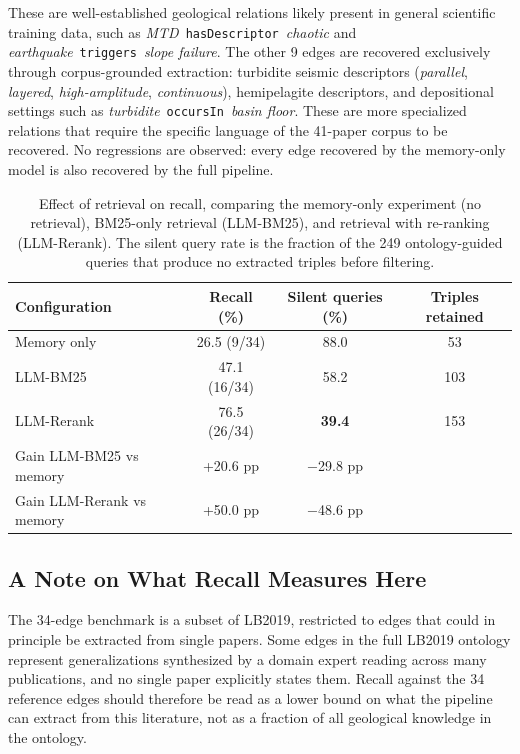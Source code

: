 \documentclass[10pt]{article}
\newcommand{\pred}[1]{\texttt{\small #1}}
\begin{document}
These are well-established geological relations likely present in
general scientific training data, such as
\emph{MTD}~\pred{hasDescriptor}~\emph{chaotic} and
\emph{earthquake}~\pred{triggers}~\emph{slope failure}.
The other 9 edges are recovered exclusively through corpus-grounded
extraction: turbidite seismic descriptors (\emph{parallel},
\emph{layered}, \emph{high-amplitude}, \emph{continuous}),
hemipelagite descriptors, and depositional settings such as
\emph{turbidite}~\pred{occursIn}~\emph{basin floor}.
These are more specialized relations that require the specific
language of the 41-paper corpus to be recovered.
No regressions are observed: every edge recovered by the memory-only
model is also recovered by the full pipeline.

\begin{table}[htb]
\centering
\caption{Effect of retrieval on recall, comparing the
  memory-only experiment (no retrieval), BM25-only
  retrieval (LLM-BM25), and retrieval with re-ranking (LLM-Rerank).
  The silent query rate is the fraction of the 249
  ontology-guided queries that produce no extracted
  triples before filtering.}
\label{tab:expb}
\small
\begin{tabular}{lccc}
\toprule
\textbf{Configuration} & \textbf{Recall (\%)} &
\textbf{Silent queries (\%)} &
\textbf{Triples retained} \\
\midrule
Memory only  & 26.5 (9/34)   & 88.0 &  53 \\
LLM-BM25 & 47.1 (16/34) & 58.2 & 103 \\
LLM-Rerank & 76.5 (26/34) & \textbf{39.4} & 153 \\
\midrule
Gain LLM-BM25 vs memory  & +20.6 pp & $-$29.8 pp & \\
Gain LLM-Rerank vs memory & +50.0 pp & $-$48.6 pp & \\
\bottomrule
\end{tabular}
\end{table}

\subsection{A Note on What Recall Measures Here}
\label{sec:recoverability}

The 34-edge benchmark is a subset of LB2019, restricted to edges
that could in principle be extracted from single papers.
Some edges in the full LB2019 ontology represent generalizations
synthesized by a domain expert reading across many publications,
and no single paper explicitly states them.
Recall against the 34 reference edges should therefore be read as a
lower bound on what the pipeline can extract from this literature,
not as a fraction of all geological knowledge in the ontology.
\end{document}
